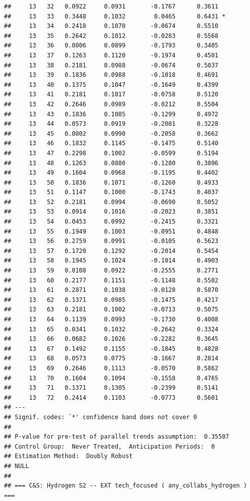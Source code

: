 \documentclass[
]{article}
\begin{document}
\begin{verbatim}
##     13   32   0.0922     0.0931       -0.1767      0.3611  
##     13   33   0.3448     0.1032        0.0465      0.6431 *
##     13   34   0.2418     0.1070       -0.0674      0.5510  
##     13   35   0.2642     0.1012       -0.0283      0.5568  
##     13   36   0.0806     0.0899       -0.1793      0.3405  
##     13   37   0.1263     0.1120       -0.1974      0.4501  
##     13   38   0.2181     0.0988       -0.0674      0.5037  
##     13   39   0.1836     0.0988       -0.1018      0.4691  
##     13   40   0.1375     0.1047       -0.1649      0.4399  
##     13   41   0.2181     0.1017       -0.0758      0.5120  
##     13   42   0.2646     0.0989       -0.0212      0.5504  
##     13   43   0.1836     0.1085       -0.1299      0.4972  
##     13   44   0.0573     0.0919       -0.2081      0.3228  
##     13   45   0.0802     0.0990       -0.2058      0.3662  
##     13   46   0.1832     0.1145       -0.1475      0.5140  
##     13   47   0.2298     0.1002       -0.0599      0.5194  
##     13   48   0.1263     0.0880       -0.1280      0.3806  
##     13   49   0.1604     0.0968       -0.1195      0.4402  
##     13   50   0.1836     0.1071       -0.1260      0.4933  
##     13   51   0.1147     0.1000       -0.1743      0.4037  
##     13   52   0.2181     0.0994       -0.0690      0.5052  
##     13   53   0.0914     0.1016       -0.2023      0.3851  
##     13   54   0.0453     0.0992       -0.2415      0.3321  
##     13   55   0.1949     0.1003       -0.0951      0.4848  
##     13   56   0.2759     0.0991       -0.0105      0.5623  
##     13   57   0.1720     0.1292       -0.2014      0.5454  
##     13   58   0.1945     0.1024       -0.1014      0.4903  
##     13   59   0.0108     0.0922       -0.2555      0.2771  
##     13   60   0.2177     0.1151       -0.1148      0.5502  
##     13   61   0.2871     0.1038       -0.0128      0.5870  
##     13   62   0.1371     0.0985       -0.1475      0.4217  
##     13   63   0.2181     0.1002       -0.0713      0.5075  
##     13   64   0.1139     0.0993       -0.1730      0.4008  
##     13   65   0.0341     0.1032       -0.2642      0.3324  
##     13   66   0.0682     0.1026       -0.2282      0.3645  
##     13   67   0.1492     0.1155       -0.1845      0.4828  
##     13   68   0.0573     0.0775       -0.1667      0.2814  
##     13   69   0.2646     0.1113       -0.0570      0.5862  
##     13   70   0.1604     0.1094       -0.1558      0.4765  
##     13   71   0.1371     0.1305       -0.2399      0.5141  
##     13   72   0.2414     0.1103       -0.0773      0.5601  
## ---
## Signif. codes: `*' confidence band does not cover 0
## 
## P-value for pre-test of parallel trends assumption:  0.35507
## Control Group:  Never Treated,  Anticipation Periods:  0
## Estimation Method:  Doubly Robust
## NULL
## 
## === C&S: Hydrogen S2 -- EXT tech_focused ( any_collabs_hydrogen ) ===
\end{verbatim}
\end{document}
